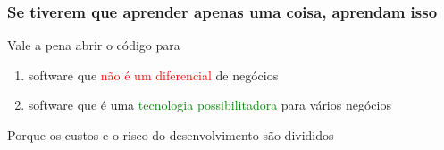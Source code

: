 \documentclass[xcolor=dvipsnames]{beamer}
\newcommand{\tred}[1]{\textcolor{red}{#1}}
\newcommand{\tgreen}[1]{\textcolor{green}{#1}}
\newcommand{\bgreen}[1]{\colorbox{green}{#1}}
\begin{document}
\begin{frame}
	\frametitle{Se tiverem que aprender apenas uma coisa, aprendam isso}
	{\Large Vale a pena abrir o código para}\vspace{0.1cm}
	\begin{enumerate}
	\item software que \tred{não é um diferencial} de negócios\vspace{0.1cm}
	\item software que é uma \tgreen{tecnologia possibilitadora} para vários negócios\vspace{0.1cm}
	\end{enumerate}
	\vspace{0.2cm}
	{\large Porque os custos e o risco do desenvolvimento são divididos}\vspace{0.2cm} 
\end{frame}
\end{document}
